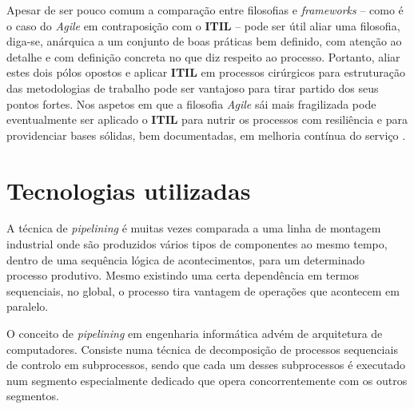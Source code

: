\hspace{1cm}Apesar de ser pouco comum a comparação entre filosofias e \textit{frameworks} -- como é o caso do \textit{Agile} em contraposição com o \textbf{ITIL} -- pode ser útil aliar uma filosofia, diga-se, anárquica a um conjunto de boas práticas bem definido, com atenção ao detalhe e com definição concreta no que diz respeito ao processo. Portanto, aliar estes dois pólos opostos e aplicar \textbf{ITIL} em processos cirúrgicos para estruturação das metodologias de trabalho pode ser vantajoso para tirar partido dos seus pontos fortes. Nos aspetos em que a filosofia \textit{Agile} sái mais fragilizada pode eventualmente ser aplicado o \textbf{ITIL} para nutrir os processos com resiliência e para providenciar bases sólidas, bem documentadas, em melhoria contínua do serviço \cite{axelositilandagile}.   
\section{Tecnologias utilizadas}
\label{Ch:TeoriaDasPipes}

\hspace{1cm}A técnica de \textit{pipelining} é muitas vezes comparada a uma linha de montagem industrial onde são produzidos vários tipos de componentes ao mesmo tempo, dentro de uma sequência lógica de acontecimentos, para um determinado processo produtivo. Mesmo existindo uma certa dependência em termos sequenciais, no global, o processo tira vantagem de operações que acontecem em paralelo.

\hspace{1cm}O conceito de \textit{pipelining} em engenharia informática advém de arquitetura de computadores. Consiste numa técnica de decomposição de processos sequenciais de controlo em subprocessos, sendo que cada um desses subprocessos é executado num segmento especialmente dedicado que opera concorrentemente com os outros segmentos. 

